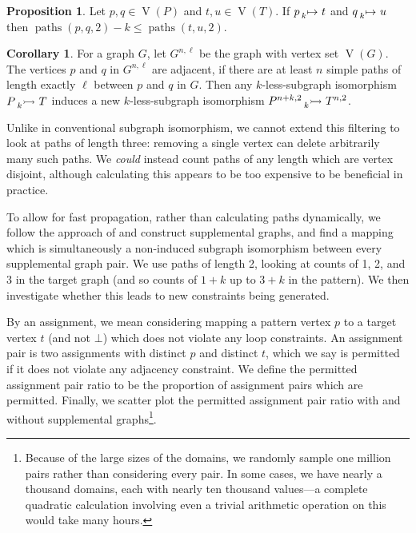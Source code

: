 \documentclass[letterpaper]{article}
\newcommand{\citet}[1]{\citeauthor{#1} \shortcite{#1}}
\theoremstyle{definition}
\newtheorem{proposition}{Proposition}
\newtheorem{corollary}{Corollary}
\newcommand{\paths}{\operatorname{paths}}
\newcommand{\lessnonind}[1]{\prescript{}{#1}{\rightarrowtail}\ }
\newcommand{\lessmap}[1]{\prescript{}{#1}{\mapsto}\ }
\newcommand{\V}{\operatorname{V}}
\begin{document}
\begin{proposition}\label{prop:paths}
    Let $p,q \in \V(P)$ and $t,u\in \V(T)$. If $p \lessmap{k} t$ and $q \lessmap{k} u$ then
     $\paths(p, q, 2) - k \le \paths(t, u, 2)$.
\end{proposition}

\begin{corollary}
    For a graph $G$, let $G^{n, \ell}$ be the graph with vertex set $\V(G)$. The
    vertices $p$ and $q$ in $G^{n, \ell}$ are adjacent, if there are at least $n$ simple paths of
    length exactly $\ell$ between $p$ and $q$ in $G$. Then any $k$-less-subgraph isomorphism
    $P \lessnonind{k} T$ induces a new $k$-less-subgraph isomorphism
    $P^{n+k, 2}\lessnonind{k} T^{n, 2}$.
\end{corollary}

Unlike in conventional subgraph isomorphism, we cannot extend this filtering to look at paths of
length three: removing a single vertex can delete arbitrarily many such paths. We \emph{could}
instead count paths of any length which are vertex disjoint, although calculating this appears to be
too expensive to be beneficial in practice.

To allow for fast propagation, rather than calculating paths dynamically, we follow the approach of
\citet{DBLP:conf/cp/McCreeshP15} and construct supplemental graphs, and find a mapping which is
simultaneously a non-induced subgraph isomorphism between every supplemental graph pair. We use
paths of length 2, looking at counts of 1, 2, and 3 in the target graph (and so counts of $1 + k$ up
to $3 + k$ in the pattern).  We then investigate whether this leads to new constraints being
generated.

By an assignment, we mean considering mapping a pattern vertex $p$ to a target vertex $t$ (and not
$\bot$) which does not violate any loop constraints. An assignment pair is two assignments with
distinct $p$ and distinct $t$, which we say is permitted if it does not violate any adjacency
constraint. We define the permitted assignment pair ratio to be the proportion of assignment pairs
which are permitted.  Finally, we scatter plot the permitted assignment pair ratio with and without
supplemental graphs\footnote{Because of the large sizes of the domains, we randomly sample one
million pairs rather than considering every pair. In some cases, we have nearly a thousand domains,
each with nearly ten thousand values---a complete quadratic calculation involving even a trivial
arithmetic operation on this would take many hours.}.
\end{document}
